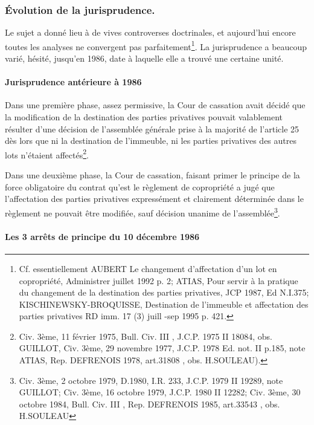 		\subsubsection{Évolution de la jurisprudence.}
		
			Le sujet a donné lieu à de vives controverses doctrinales, et aujourd’hui encore toutes les analyses ne convergent pas parfaitement\footnote{Cf. essentiellement AUBERT Le changement d'affectation d'un lot en copropriété, Administrer juillet 1992 p. 2; ATIAS, Pour servir à la pratique du changement de la destination des parties privatives, JCP 1987, Ed N.I.375; KISCHINEWSKY-BROQUISSE, Destination de l'immeuble et affectation des parties privatives RD imm. 17 (3) juill -sep 1995 p. 421.}. La jurisprudence a beaucoup varié, hésité, jusqu'en 1986, date à laquelle elle a trouvé une certaine unité.

			\paragraph{Jurisprudence antérieure à 1986}
			
				Dans une première phase, assez permissive, la Cour de cassation avait décidé que la modification de la destination des parties privatives pouvait valablement résulter d'une décision de l'assemblée générale prise à la majorité de l'article 25 dès lors que ni la destination de l'immeuble, ni les parties privatives des autres lots n'étaient affectés\footnote{Civ. 3ème, 11 février 1975, Bull. Civ. III , J.C.P. 1975 II 18084, obs. GUILLOT, Civ. 3ème, 29 novembre 1977, J.C.P. 1978 Ed. not. II p.185, note ATIAS, Rep. DEFRENOIS 1978, art.31808 , obs. H.SOULEAU).}.
				
				Dans une deuxième phase, la Cour de cassation, faisant primer le principe de la force obligatoire du contrat qu'est le règlement de copropriété a jugé que l'affectation des parties privatives expressément et clairement déterminée dans le règlement ne pouvait être modifiée, sauf décision unanime de l'assemblée\footnote{Civ. 3ème, 2 octobre 1979, D.1980, I.R. 233, J.C.P. 1979 II 19289, note GUILLOT; Civ. 3ème, 16 octobre 1979, J.C.P. 1980 II 12282; Civ. 3ème, 30 octobre 1984, Bull. Civ. III , Rep. DEFRENOIS 1985, art.33543 , obs. H.SOULEAU}.
			
			\paragraph{Les 3 arrêts de principe du 10 décembre 1986}
			
